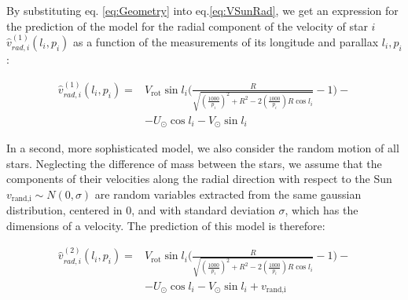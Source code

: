 


\noindent
By substituting eq.%
\ref{eq:Geometry} into eq.\ref{eq:VSunRad}, we get an expression for the prediction of the model for the radial component of the velocity of star $i$ $\hat{v}_{rad,i}^{(1)}(l_i, p_i)$ as a function of the measurements of its longitude and parallax $l_i, p_i$:

\begin{equation}\label{eq:VradModel1}
    \begin{aligned}
        \hat{v}_{rad,i}^{(1)}(l_i, p_i) =&  V_{\text{rot}}\sin l_i \biggl( \frac{R}{\sqrt{(\frac{1000}{p_i})^2 + R^2 - 2(\frac{1000}{p_i})R \cos l_i}}-1 \biggr) -\\
        &- U_{\odot}\cos l_i - V_{\odot}\sin l_i
    \end{aligned}
\end{equation}

In a second, more sophisticated model, we also consider the random motion of all stars. Neglecting the difference of mass between the stars, we assume that the components of their velocities along the radial direction with respect to the Sun $v_{\text{rand,i}} \sim N(0, \sigma)$ are random variables extracted from the same gaussian distribution, centered in 0, and with standard deviation $\sigma$, which has the dimensions of a velocity. The prediction of this model is therefore:

\begin{equation}\label{eq:VradModel2}
    \begin{aligned}
        \hat{v}_{rad,i}^{(2)}(l_i, p_i) =&  V_{\text{rot}}\sin l_i \biggl( \frac{R}{\sqrt{(\frac{1000}{p_i})^2 + R^2 - 2(\frac{1000}{p_i})R \cos l_i}}-1 \biggr) -\\
        &- U_{\odot}\cos l_i - V_{\odot}\sin l_i + v_{\text{rand,i}}
    \end{aligned}
\end{equation}
